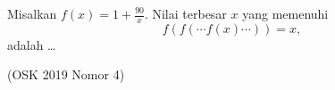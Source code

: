 Misalkan $f(x) = 1 + \frac{90}{x}$. Nilai terbesar $x$ yang memenuhi
\[
f(f(\cdots f(x) \cdots)) = x,
\]
adalah \ldots

(OSK 2019 Nomor 4)